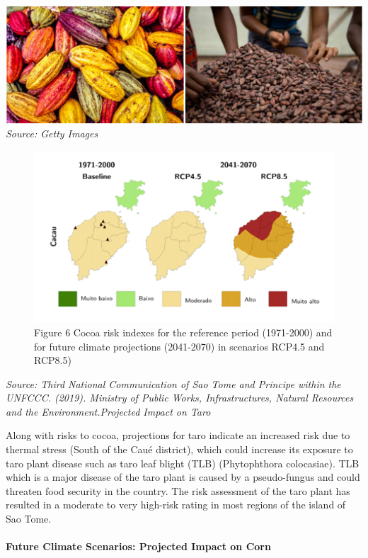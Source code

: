 \documentclass[
]{book}
\begin{document}
\includegraphics{images/cocoa_getty.png}
\emph{Source: Getty Images}

\begin{figure}
\centering
\includegraphics{images/cocoa_risk.png}
\caption{Figure 6 Cocoa risk indexes for the reference period (1971-2000) and for future climate projections (2041-2070) in scenarios RCP4.5 and RCP8.5)}
\end{figure}

\emph{Source: Third National Communication of Sao Tome and Principe within the UNFCCC. (2019). Ministry of Public Works, Infrastructures, Natural Resources and the Environment.Projected Impact on Taro}

Along with risks to cocoa, projections for taro indicate an increased risk due to thermal stress (South of the Caué district), which could increase its exposure to taro plant disease such as taro leaf blight (TLB) (Phytophthora colocasiae). TLB which is a major disease of the taro plant is caused by a pseudo-fungus and could threaten food security in the country. The risk assessment of the taro plant has resulted in a moderate to very high-risk rating in most regions of the island of Sao Tome.

\hypertarget{future-climate-scenarios-projected-impact-on-corn}{%
\paragraph{Future Climate Scenarios: Projected Impact on Corn}\label{future-climate-scenarios-projected-impact-on-corn}}
\end{document}
